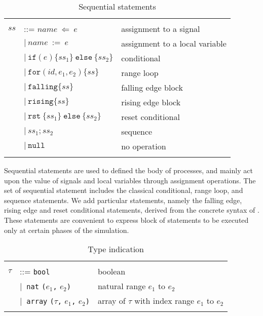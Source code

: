 \begin{table}[!htbp]
  \caption{Sequential statements}
  \label{tab:ss}
  \begin{tabular}{|rll|}
    \hline
    & & \\
    $ss$ & ::= $name~\mathtt{\Leftarrow}~e$ & assignment to a signal \\
    & \quad$\vert{}~name~\mathtt{:=}~e$ & assignment to a local variable \\
    & \quad$\vert{}~\mathtt{if}(e)\{ss_1\}~\mathtt{else}~\{ss_2\}$ & conditional \\
    & \quad$\vert{}~\mathtt{for}(id,e_1,e_2)\{ss\}$ & range loop \\
    & \quad$\vert{}~\mathtt{falling}\{ss\}$ & falling edge block \\
    & \quad$\vert{}~\mathtt{rising}\{ss\}$ & rising edge block \\
    & \quad$\vert{}~\mathtt{rst}~\{ss_1\}~\mathtt{else}~\{ss_2\}$ & reset conditional \\
    & \quad$\vert{}~ss_1\mathtt{;}ss_2$ & sequence \\
    & \quad$\vert{}~\mathtt{null}$ & no operation \\
    & & \\
    \hline
  \end{tabular}
\end{table}

Sequential statements are used to defined the body of processes, and
mainly act upon the value of signals and local variables through
assignment operations. The set of sequential statement includes the
classical conditional, range loop, and sequence statements. We add
particular statements, namely the falling edge, rising edge and reset
conditional statements, derived from the concrete syntax of \vhdl{}.
These statements are convenient to express block of statements to be
executed only at certain phases of the simulation.


\begin{table}[!htbp]
  \caption{Type indication}
  \label{tab:typeind}
  \begin{tabular}{|rll|}
    \hline
    & & \\
    $\tau$ & ::= \texttt{bool} & boolean \\
    & \quad$\vert{}~$ \texttt{nat} \texttt{(}$e_1$\texttt{,} $e_2$\texttt{)} & natural range $e_1$ to $e_2$ \\
    & \quad$\vert{}~$ \texttt{array} \texttt{(}$\tau$\texttt{,} $e_1$\texttt{,} $e_2$\texttt{)} & array of $\tau$ with index range $e_1$ to $e_2$ \\
    & & \\
    \hline
  \end{tabular}
\end{table}


